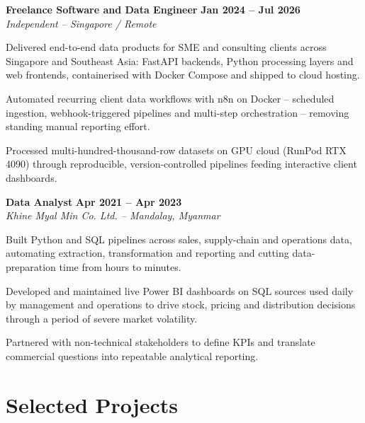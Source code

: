 \documentclass[letterpaper,10pt]{article}
\newcommand{\role}[4]{%
  \textbf{#1} \hfill \textbf{#3}\\
  \textit{#2} \hfill \textit{#4}\\[2pt]
}
\begin{document}
\vspace{4pt}
\role{Freelance Software and Data Engineer}
     {Independent -- Singapore / Remote}
     {Jan 2024 -- Jul 2026}{}
\begin{tight}
  \item Delivered end-to-end data products for SME and consulting clients across Singapore
  and Southeast Asia: FastAPI backends, Python processing layers and web frontends,
  containerised with Docker Compose and shipped to cloud hosting.
  \item Automated recurring client data workflows with n8n on Docker -- scheduled ingestion,
  webhook-triggered pipelines and multi-step orchestration -- removing standing manual
  reporting effort.
  \item Processed multi-hundred-thousand-row datasets on GPU cloud (RunPod RTX 4090) through
  reproducible, version-controlled pipelines feeding interactive client dashboards.
\end{tight}

\vspace{4pt}
\role{Data Analyst}
     {Khine Myal Min Co. Ltd. -- Mandalay, Myanmar}
     {Apr 2021 -- Apr 2023}{}
\begin{tight}
  \item Built Python and SQL pipelines across sales, supply-chain and operations data,
  automating extraction, transformation and reporting and cutting data-preparation time
  from hours to minutes.
  \item Developed and maintained live Power BI dashboards on SQL sources used daily by
  management and operations to drive stock, pricing and distribution decisions through a
  period of severe market volatility.
  \item Partnered with non-technical stakeholders to define KPIs and translate commercial
  questions into repeatable analytical reporting.
\end{tight}

\section*{Selected Projects}
\end{document}
